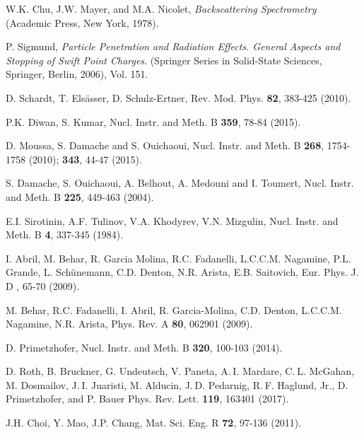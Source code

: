 \documentclass[aps,pra,reprint,superscriptaddress]{revtex4-1}
\begin{document}
\begin{thebibliography}{00}
W.K. Chu, J.W. Mayer, and M.A. Nicolet,
\textit{Backscattering Spectrometry}
(Academic Press, New York, 1978).

P. Sigmund, 
\textit{Particle Penetration and Radiation Effects. General Aspects and 
Stopping of Swift Point Charges}.
(Springer Series in Solid-State Sciences, Springer, Berlin, 2006), Vol. 151.

D. Schardt, T. Els\"asser, D. Schulz-Ertner, 
Rev. Mod. Phys. \textbf{82},  383-425 (2010).

P.K. Diwan, S. Kumar, 
Nucl. Instr. and Meth. B \textbf{359}, 78-84 (2015).

D. Moussa, S. Damache and S. Ouichaoui, 
Nucl. Instr. and Meth. B \textbf{268}, 1754-1758 (2010); 
\textbf{343},  44-47 (2015).

S. Damache, S. Ouichaoui, A. Belhout, A. Medouni and I. Toumert, 
Nucl. Instr. and Meth. B \textbf{225}, 449-463 (2004).

E.I. Sirotinin, A.F. Tulinov, V.A. Khodyrev, V.N. Mizgulin, 
Nucl. Instr. and Meth. B \textbf{4}, 337-345 (1984).

I. Abril, M. Behar, R. Garcia Molina, R.C. Fadanelli, L.C.C.M. Nagamine, 
P.L. Grande, L. Sch\"unemann, C.D. Denton, N.R. Arista, E.B. Saitovich,
Eur. Phys. J. D , 65-70 (2009).

M. Behar, R.C. Fadanelli, I. Abril, R. Garcia-Molina, C.D. Denton, 
L.C.C.M. Nagamine, N.R. Arista, 
Phys. Rev. A \textbf{80},  062901 (2009).

D. Primetzhofer, 
Nucl. Instr. and Meth. B \textbf{320}, 100-103 (2014).

D. Roth, B. Bruckner, G. Undeutsch, V. Paneta, A. I. Mardare, 
C. L. McGahan, M. Dosmailov, J. I. Juaristi, M. Alducin, 
J. D. Pedarnig, R. F. Haglund, Jr., D. Primetzhofer, and P. Bauer
Phys. Rev. Lett. \textbf{119}, 163401 (2017).

J.H. Choi, Y. Mao, J.P. Chang, 
Mat. Sci. Eng. R \textbf{72}, 97-136 (2011).


\end{thebibliography}
\end{document}

